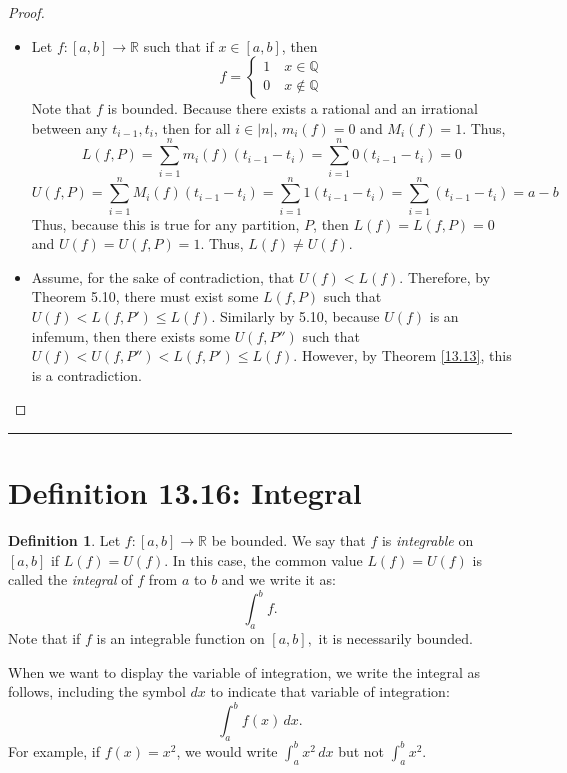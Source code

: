 \documentclass[openany, amssymb, psamsfonts]{amsart}
\newcommand{\bbQ}{\mathbb{Q}}
\newcommand{\bbR}{\mathbb{R}}
\theoremstyle{definition}
\newtheorem{defn}{Definition}[section]
\numberwithin{equation}{section}
\begin{document}
\begin{proof}
\begin{itemize}
    \item Let $f: [a,b] \to \bbR$ such that if $x\in [a,b]$, then \[f = \begin{cases}
        1  \quad x\in \bbQ\\
        0 \quad x \notin \bbQ
    \end{cases}\]
    Note that $f$ is bounded. Because there exists a rational and an irrational between any $t_{i-1}, t_i$, then for all $i\in |n|$, $m_i(f) = 0$ and $M_i(f) = 1$. Thus, 
    \[L(f,P) = \sum_{i=1}^nm_i(f)(t_{i-1} - t_{i}) = \sum_{i=1}^n0(t_{i-1} - t_{i}) = 0\]
    \[U(f,P) = \sum_{i=1}^nM_i(f)(t_{i-1} - t_{i}) = \sum_{i=1}^n1(t_{i-1} - t_{i}) = \sum_{i=1}^n(t_{i-1} - t_{i}) = a-b\]
    Thus, because this is true for any partition, $P$, then $L(f) = L(f,P)= 0$ and $U(f) = U(f,P) = 1$. Thus, $L(f) \neq U(f)$.
    \item Assume, for the sake of contradiction, that $U(f)< L(f)$. Therefore, by Theorem 5.10, there must exist some $L(f,P)$ such that $U(f)<L(f,P')\leq L(f)$. Similarly by 5.10, because $U(f)$ is an infemum, then there exists some $U(f,P'')$ such that $U(f)< U(f,P'') < L(f,P')\leq L(f)$. However, by Theorem \ref{13.13}, this is a contradiction.  
\end{itemize}

\end{proof}\vspace{4pt}     \hrule   \vspace{4pt}

\section*{Definition 13.16: Integral}
\begin{defn}
\label{13.16}
	Let $f\colon [a, b] \to \bbR$ be bounded. We say that $f$ is \emph{integrable} on $[a, b]$ if $L(f) = U(f)$. In this case, the common value $L(f) = U(f)$ is called the \emph{integral} of $f$ from $a$ to $b$ and we write it as:
	\[
		\int_{a}^{b} f.
	\]
	Note that if $f$ is an integrable function on $[a,b],$ it is necessarily bounded.

When we want to display the variable of integration, we write the integral as follows, including the symbol $dx$ to indicate that variable of integration:
\[
	\int_{a}^{b} f(x) \, dx.
\]
For example, if $f(x) = x^2$, we would write 
$\displaystyle{\int_{a}^{b} x^2 \, dx}$ but not $\displaystyle{\int_{a}^{b} x^2}$.
\end{defn}
\end{document}
